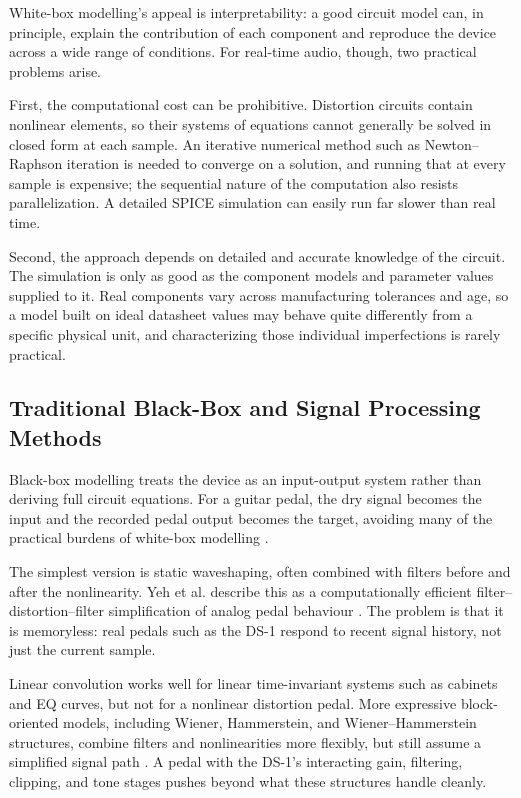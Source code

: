 White-box modelling's appeal is interpretability: a good circuit model can, in principle, explain the contribution of each component and reproduce the device across a wide range of conditions. For real-time audio, though, two practical problems arise.

First, the computational cost can be prohibitive. Distortion circuits contain nonlinear elements, so their systems of equations cannot generally be solved in closed form at each sample. An iterative numerical method such as Newton--Raphson iteration is needed to converge on a solution, and running that at every sample is expensive; the sequential nature of the computation also resists parallelization. A detailed SPICE simulation can easily run far slower than real time.

Second, the approach depends on detailed and accurate knowledge of the circuit. The simulation is only as good as the component models and parameter values supplied to it. Real components vary across manufacturing tolerances and age, so a model built on ideal datasheet values may behave quite differently from a specific physical unit, and characterizing those individual imperfections is rarely practical.

\subsection{Traditional Black-Box and Signal Processing Methods}

Black-box modelling treats the device as an input-output system rather than deriving full circuit equations. For a guitar pedal, the dry signal becomes the input and the recorded pedal output becomes the target, avoiding many of the practical burdens of white-box modelling \cite{martinez_ramirez_deep_2020,wright_real-time_2019}.

The simplest version is static waveshaping, often combined with filters before and after the nonlinearity. Yeh et al. describe this as a computationally efficient filter--distortion--filter simplification of analog pedal behaviour \cite{yeh_simplified_2007}. The problem is that it is memoryless: real pedals such as the DS-1 respond to recent signal history, not just the current sample.

Linear convolution works well for linear time-invariant systems such as cabinets and EQ curves, but not for a nonlinear distortion pedal. More expressive block-oriented models, including Wiener, Hammerstein, and Wiener--Hammerstein structures, combine filters and nonlinearities more flexibly, but still assume a simplified signal path \cite{wright_real-time_2019}. A pedal with the DS-1's interacting gain, filtering, clipping, and tone stages pushes beyond what these structures handle cleanly.

